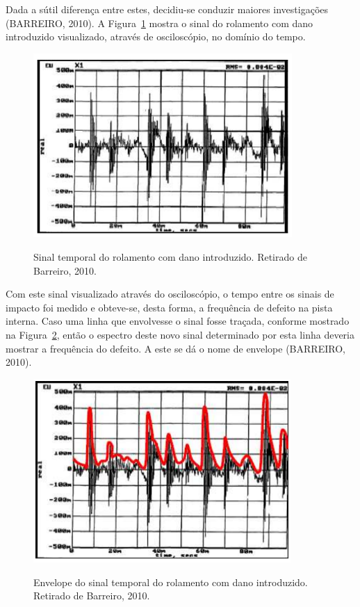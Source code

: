 \documentclass[
	12pt,				
	oneside,			
	a4paper,			
	english,			
	brazil,			
	]{abntex2ppgsi}
\begin{document}
Dada a sútil diferença entre estes, decidiu-se conduzir maiores investigações (BARREIRO, 2010). A Figura~\ref{sinal_temporal_rolamento_barreiro} mostra o sinal do rolamento com dano introduzido visualizado, através de osciloscópio, no domínio do tempo.

\begin{figure}[H]
\centering
\caption {Sinal temporal do rolamento com dano introduzido. Retirado de Barreiro, 2010.}
\includegraphics[width=\textwidth,height=70mm,keepaspectratio]{sinal_temporal_rolamento_barreiro}
\label{sinal_temporal_rolamento_barreiro}
\end{figure}

Com este sinal visualizado através do osciloscópio, o tempo entre os sinais de impacto foi medido e obteve-se, desta forma, a frequência de defeito na pista interna. Caso uma linha que envolvesse o sinal fosse traçada, conforme mostrado na Figura~\ref{sinal_envelope_rolamento_barreiro}, então o espectro deste novo sinal determinado por esta linha deveria mostrar a frequência do defeito. A este se dá o nome de envelope (BARREIRO, 2010). 

\begin{figure}[H]
\centering
\caption {Envelope do sinal temporal do rolamento com dano introduzido. Retirado de Barreiro, 2010.}
\includegraphics[width=\textwidth,height=70mm,keepaspectratio]{sinal_envelope_rolamento_barreiro}
\label{sinal_envelope_rolamento_barreiro}
\end{figure}
\end{document}
